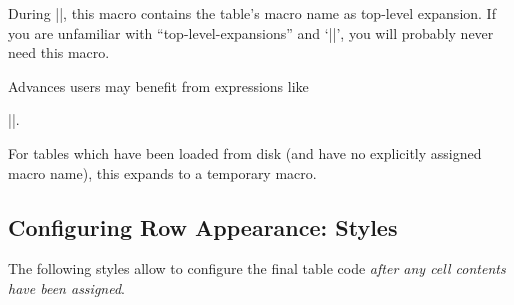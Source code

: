 \begin{command}{\pgfplotstablename}
    During |\pgfplotstabletypeset|, this macro contains the table's macro name
    as top-level expansion. If you are unfamiliar with ``top-level-expansions''
    and `|\expandafter|', you will probably never need this macro.

    Advances users may benefit from expressions like

    |\expandafter\pgfplotstabletypeset\pgfplotstablename|.

    For tables which have been loaded from disk (and have no explicitly
    assigned macro name), this expands to a temporary macro.
\end{command}


\subsection{Configuring Row Appearance: Styles}

The following styles allow to configure the final table code \emph{after any
cell contents have been assigned}.

